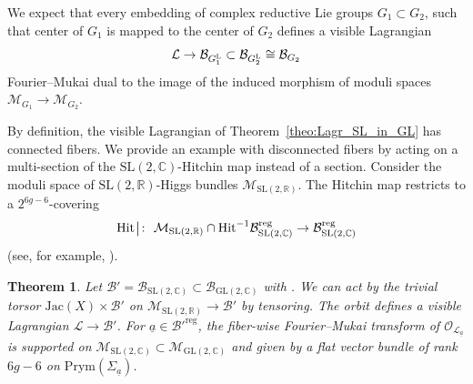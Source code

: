 \documentclass[pdftex]{sigma}
\numberwithin{equation}{section}
\newtheorem{theo}{Theorem}[section]
\theoremstyle{definition}
\newcommand{\reg}{\mathrm{reg}}
\newcommand{\Jac}{\mathrm{Jac}}
\newcommand{\rest}{\: \rule[-3.5pt]{0.5pt}{11.5pt}\,{}}
\renewcommand{\to}{\rightarrow}
\newcommand{\calB}{\mathcal{B}}
\newcommand{\calL}{\mathcal{L}}
\newcommand{\calM}{\mathcal{M}}
\newcommand{\calO}{\mathcal{O}}
\newcommand{\RR}{\mathbb{R}}
\newcommand{\CC}{\mathbb{C}}
\newcommand{\Prym}{\mathrm{Prym}}
\newcommand{\Hit}{\mathrm{Hit}}
\newcommand{\GL}{\mathrm{GL}}
\newcommand{\SL}{\mathrm{SL}}
\begin{document}
We expect that every embedding of complex reductive Lie groups $G_1 \subset G_2$, such that center of $G_1$ is mapped to the center of $G_2$ defines a visible Lagrangian
\[ \calL \to \calB_{G_1^{\rm L}}\subset \calB_{G_2^{\rm L}}\cong \calB_{G_2}
 \] Fourier--Mukai dual to the image of the induced morphism of moduli spaces $\calM_{G_1} \rightarrow \calM_{G_2}$.

By definition, the visible Lagrangian of Theorem~\ref{theo:Lagr_SL_in_GL} has connected fibers. We provide an example with disconnected fibers by acting on a multi-section of the $\SL(2,\CC)$-Hitchin map instead of a section. Consider the moduli space of $\SL(2,\RR)$-Higgs bundles $\calM_{\SL(2,\RR)}$. The Hitchin map restricts to a $2^{6g-6}$-covering
\[ \Hit\rest\colon \ \calM_{\SL(2,\RR)} \cap \Hit^{-1}\calB_{\SL(2,\CC)}^\reg \to \calB_{\SL(2,\CC)}^\reg
 \]
(see, for example, \cite[Corollary~9.3]{Horn1}).
\begin{theo}\label{theo:Lagr_SL_in_GL_multisection} Let $\calB'=\calB_{\SL(2,\CC)} \subset \calB_{\GL(2,\CC)}$ with \smash{$\calB'^\reg=\calB^{\reg}_{\SL(2,\CC)}$}. We can act by the trivial torsor $\Jac(X) \times \calB'$ on $\calM_{\SL(2,\RR)} \to \calB'$ by tensoring. The orbit defines a visible Lagrangian $\calL \to \calB'$. For $\underline{a} \in \calB'^\reg$, the fiber-wise Fourier--Mukai transform of $\calO_{\calL_{\underline{a}}}$ is supported on $\calM_{\SL(2,\CC)} \subset \calM_{\GL(2,\CC)}$ and given by a flat vector bundle of rank $6g-6$ on $\Prym(\Sigma_{\underline{a}})$.
\end{theo}
\end{document}
